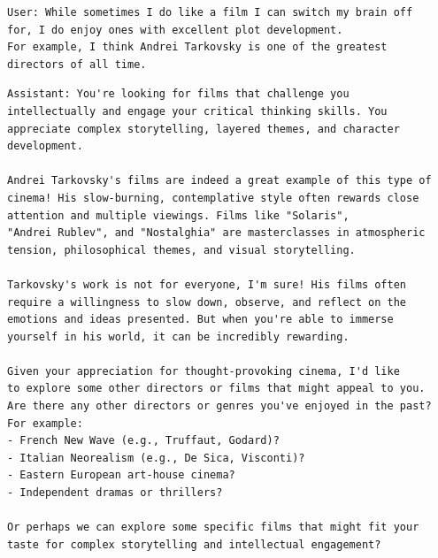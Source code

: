 
\begin{lstlisting}[basicstyle=\ttfamily, frame=single]
User: While sometimes I do like a film I can switch my brain off 
for, I do enjoy ones with excellent plot development. 
For example, I think Andrei Tarkovsky is one of the greatest 
directors of all time.
\end{lstlisting}

\begin{lstlisting}[basicstyle=\ttfamily, frame=single]
Assistant: You're looking for films that challenge you 
intellectually and engage your critical thinking skills. You 
appreciate complex storytelling, layered themes, and character 
development.

Andrei Tarkovsky's films are indeed a great example of this type of 
cinema! His slow-burning, contemplative style often rewards close 
attention and multiple viewings. Films like "Solaris", 
"Andrei Rublev", and "Nostalghia" are masterclasses in atmospheric 
tension, philosophical themes, and visual storytelling.

Tarkovsky's work is not for everyone, I'm sure! His films often 
require a willingness to slow down, observe, and reflect on the 
emotions and ideas presented. But when you're able to immerse 
yourself in his world, it can be incredibly rewarding.

Given your appreciation for thought-provoking cinema, I'd like 
to explore some other directors or films that might appeal to you. 
Are there any other directors or genres you've enjoyed in the past? 
For example:
- French New Wave (e.g., Truffaut, Godard)?
- Italian Neorealism (e.g., De Sica, Visconti)?
- Eastern European art-house cinema?
- Independent dramas or thrillers?

Or perhaps we can explore some specific films that might fit your 
taste for complex storytelling and intellectual engagement?
\end{lstlisting}